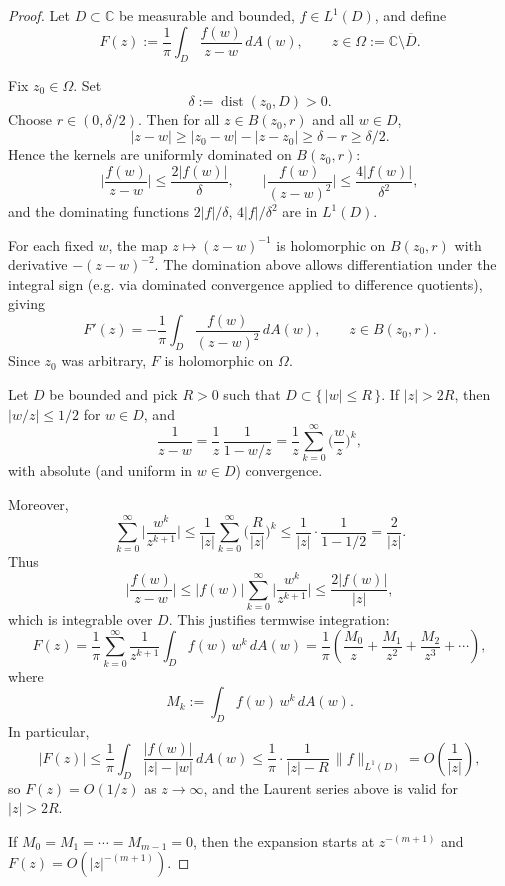 \documentclass{amsart}
\DeclareMathOperator{\dist}{dist}
\theoremstyle{plain}
\theoremstyle{remark}
\begin{document}
\begin{proof}
Let \(D\subset\mathbb C\) be measurable and bounded, \(f\in L^{1}(D)\), and define
\[
F(z):=\frac1\pi\int_D \frac{f(w)}{z-w}\,dA(w),\qquad z\in \Omega:=\mathbb C\setminus \overline D.
\]

Fix \(z_0\in\Omega\). Set
\[
\delta:=\dist(z_0,D)>0.
\]
Choose \(r\in(0,\delta/2)\). Then for all \(z\in B(z_0,r)\) and all \(w\in D\),
\[
|z-w|\ge |z_0-w|-|z-z_0|\ge \delta-r \ge \delta/2.
\]
Hence the kernels are uniformly dominated on \(B(z_0,r)\):
\[
\Big|\frac{f(w)}{z-w}\Big|\le \frac{2|f(w)|}{\delta},\qquad
\Big|\frac{f(w)}{(z-w)^2}\Big|\le \frac{4|f(w)|}{\delta^2},
\]
and the dominating functions \(2|f|/\delta\), \(4|f|/\delta^2\) are in \(L^{1}(D)\).

For each fixed \(w\), the map \(z\mapsto (z-w)^{-1}\) is holomorphic on \(B(z_0,r)\) with derivative
\(- (z-w)^{-2}\). The domination above allows differentiation under the integral sign (e.g. via dominated
convergence applied to difference quotients), giving
\[
F'(z)= -\frac1\pi\int_D \frac{f(w)}{(z-w)^2}\,dA(w),\qquad z\in B(z_0,r).
\]
Since \(z_0\) was arbitrary, \(F\) is holomorphic on \(\Omega\).

Let \(D\) be bounded and pick \(R>0\) such that \(D\subset\{\,|w|\le R\,\}\). If \(|z|>2R\), then
\(|w/z|\le 1/2\) for \(w\in D\), and
\[
\frac1{z-w}=\frac1z\,\frac1{1-w/z}
=\frac1z\sum_{k=0}^\infty \Big(\frac{w}{z}\Big)^k,
\]
with absolute (and uniform in \(w\in D\)) convergence.

Moreover,
\[
\sum_{k=0}^\infty \Big|\frac{w^k}{z^{k+1}}\Big|
\le \frac1{|z|}\sum_{k=0}^\infty \Big(\frac{R}{|z|}\Big)^k
\le \frac1{|z|}\cdot \frac1{1-1/2}=\frac{2}{|z|}.
\]
Thus
\[
\Big|\frac{f(w)}{z-w}\Big|
\le |f(w)|\sum_{k=0}^\infty \Big|\frac{w^k}{z^{k+1}}\Big|
\le \frac{2|f(w)|}{|z|},
\]
which is integrable over \(D\). This justifies termwise integration:
\[
F(z)=\frac1\pi\sum_{k=0}^\infty \frac{1}{z^{k+1}}\int_D f(w)\,w^k\,dA(w)
=\frac1\pi\left(\frac{M_0}{z}+\frac{M_1}{z^2}+\frac{M_2}{z^3}+\cdots\right),
\]
where
\[
M_k:=\int_D f(w)\,w^k\,dA(w).
\]
In particular,
\[
|F(z)|\le \frac1\pi\int_D \frac{|f(w)|}{|z|-|w|}\,dA(w)
\le \frac1\pi\cdot \frac{1}{|z|-R}\,\|f\|_{L^1(D)}
=O\!\left(\frac1{|z|}\right),
\]
so \(F(z)=O(1/z)\) as \(z\to\infty\), and the Laurent series above is valid for \(|z|>2R\).

If \(M_0=M_1=\cdots=M_{m-1}=0\), then the expansion starts at \(z^{-(m+1)}\) and
\(F(z)=O(|z|^{-(m+1)})\).

\end{proof}
\end{document}

